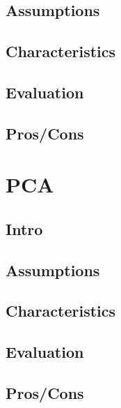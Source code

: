 \documentclass[]{book}
\begin{document}
\hypertarget{assumptions-1}{%
\subsection{Assumptions}\label{assumptions-1}}

\hypertarget{characteristics}{%
\subsection{Characteristics}\label{characteristics}}

\hypertarget{evaluation-1}{%
\subsection{Evaluation}\label{evaluation-1}}

\hypertarget{proscons-1}{%
\subsection{Pros/Cons}\label{proscons-1}}

\hypertarget{pca}{%
\section{PCA}\label{pca}}

\hypertarget{intro-2}{%
\subsection{Intro}\label{intro-2}}

\hypertarget{assumptions-2}{%
\subsection{Assumptions}\label{assumptions-2}}

\hypertarget{characteristics-1}{%
\subsection{Characteristics}\label{characteristics-1}}

\hypertarget{evaluation-2}{%
\subsection{Evaluation}\label{evaluation-2}}

\hypertarget{proscons-2}{%
\subsection{Pros/Cons}\label{proscons-2}}
\end{document}
